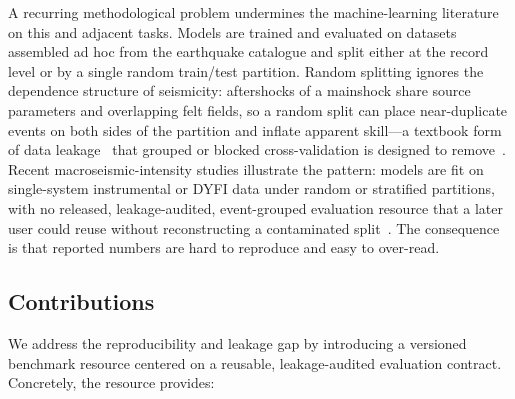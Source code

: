 \documentclass[pdflatex,sn-basic,iicol]{sn-jnl}
\begin{document}
A recurring methodological problem undermines the machine-learning literature on
this and adjacent tasks. Models are trained and evaluated on datasets assembled
ad hoc from the earthquake catalogue and split either at the record level or by a
single random train/test partition. Random splitting ignores the dependence
structure of seismicity: aftershocks of a mainshock share source parameters and
overlapping felt fields, so a random split can place near-duplicate events on
both sides of the partition and inflate apparent skill---a textbook form of data
leakage~\citep{kaufman2012leakage} that grouped or blocked cross-validation is
designed to remove~\citep{roberts2017cv}. Recent macroseismic-intensity studies
illustrate the pattern: models are fit on single-system instrumental or DYFI
data under random or stratified partitions, with no released, leakage-audited,
event-grouped evaluation resource that a later user could reuse without
reconstructing a contaminated split~\citep{patelli2026macroseismic,
mori2025explainable}. The consequence is that reported numbers are hard to
reproduce and easy to over-read.

\subsection{Contributions}\label{sec:contrib}

We address the reproducibility and leakage gap by introducing a versioned
benchmark resource centered on a reusable, leakage-audited evaluation contract.
Concretely, the resource provides:
\end{document}
